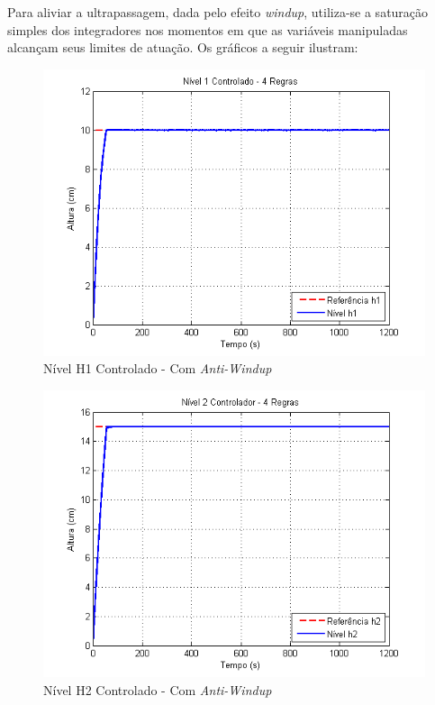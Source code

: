 Para aliviar a ultrapassagem, dada pelo efeito \textit{windup}, utiliza-se a saturação simples dos integradores nos momentos em que as variáveis manipuladas alcançam seus limites de atuação. Os gráficos a seguir ilustram:
\begin{figure}[H]
	\centering
	\includegraphics[height=0.35\paperheight ,keepaspectratio]{img/ctrl_h1ts2.png}
	\caption{\small Nível H1 Controlado - Com \textit{Anti-Windup}}
	\label{figH1TSCtrl2}
\end{figure}

\begin{figure}[H]
	\centering
	\includegraphics[height=0.35\paperheight ,keepaspectratio]{img/ctrl_h2ts2.png}
	\caption{Nível H2 Controlado - Com \textit{Anti-Windup}}
	\label{figH2CtrlTS2}
\end{figure}

